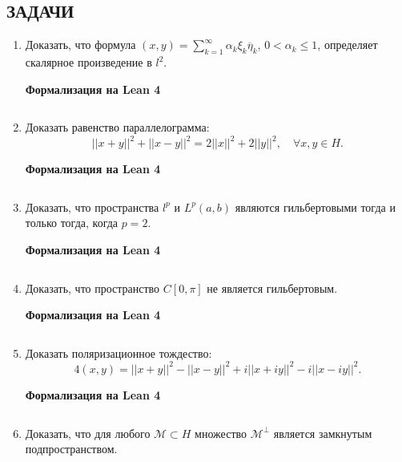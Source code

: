 \documentclass[12pt,a4paper]{article}
\begin{document}
\subsection*{ЗАДАЧИ}
\begin{enumerate}
\newpage
\item Доказать, что формула $(x,y)=\sum_{k=1}^{\infty}\alpha_{k}\xi_{k}\overline{\eta}_{k}$, $0<\alpha_{k}\le1$, определяет скалярное произведение в $l^{2}$.

\begin{center}\small\textbf{Формализация на Lean 4}\end{center}
\inputminted{lean}{FunAn/Section12_HilbertSpaces/Task01.lean}

\newpage
\item Доказать равенство параллелограмма:
$$||x+y||^{2}+||x-y||^{2}=2||x||^{2}+2||y||^{2}, \quad \forall x,y\in H.$$

\begin{center}\small\textbf{Формализация на Lean 4}\end{center}
\inputminted{lean}{FunAn/Section12_HilbertSpaces/Task02.lean}

\newpage
\item Доказать, что пространства $l^{p}$ и $L^{p}(a,b)$ являются гильбертовыми тогда и только тогда, когда $p=2$.

\begin{center}\small\textbf{Формализация на Lean 4}\end{center}
\inputminted{lean}{FunAn/Section12_HilbertSpaces/Task03.lean}

\newpage
\item Доказать, что пространство $C[0,\pi]$ не является гильбертовым.

\begin{center}\small\textbf{Формализация на Lean 4}\end{center}
\inputminted{lean}{FunAn/Section12_HilbertSpaces/Task04.lean}

\newpage
\item Доказать поляризационное тождество:
$$4(x,y)=||x+y||^{2}-||x-y||^{2}+i||x+iy||^{2}-i||x-iy||^{2}.$$

\begin{center}\small\textbf{Формализация на Lean 4}\end{center}
\inputminted{lean}{FunAn/Section12_HilbertSpaces/Task05.lean}

\newpage
\item Доказать, что для любого $\mathcal{M}\subset H$ множество $\mathcal{M}^{\perp}$ является замкнутым подпространством.


\end{enumerate}
\end{document}
